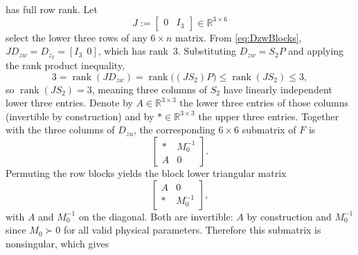 \documentclass[11pt]{article}
\newcommand{\R}{\mathbb{R}}
\newcommand{\rank}{\operatorname{rank}}
\begin{document}
has full row rank. Let
\begin{equation}
    J := \begin{bmatrix} 0 & I_3 \end{bmatrix} \in \R^{3\times 6}
    \label{eq:Jdef}
\end{equation}
select the lower three rows of any $6\times n$ matrix. From 
\eqref{eq:DzwBlocks}, $J D_{zw} = D_{z_2} = [I_3\ \ 0]$, which has rank~$3$. 
Substituting $D_{zw} = S_2 P$ and applying the rank product inequality,
\begin{equation}
    3 = \rank(J D_{zw}) = \rank\!\bigl((J S_2) P\bigr) \leq \rank(J S_2) \leq 3,
    \label{eq:rankJS2}
\end{equation}
so $\rank(J S_2) = 3$, meaning three columns of $S_2$ have linearly independent 
lower three entries. Denote by $A \in \R^{3\times 3}$ the lower three entries 
of those columns (invertible by construction) and by $* \in \R^{3\times 3}$ 
the upper three entries. Together with the three columns of $D_{zu}$, the 
corresponding $6\times 6$ submatrix of $F$ is
\begin{equation}
    \begin{bmatrix} * & M_0^{-1} \\ A & 0 \end{bmatrix}.
    \label{eq:submat}
\end{equation}
Permuting the row blocks yields the block lower triangular matrix
\begin{equation}
    \begin{bmatrix} A & 0 \\ * & M_0^{-1} \end{bmatrix},
    \label{eq:submatperm}
\end{equation}
with $A$ and $M_0^{-1}$ on the diagonal. Both are invertible: $A$ by 
construction and $M_0^{-1}$ since $M_0 \succ 0$ for all valid physical 
parameters. Therefore this submatrix is nonsingular, which gives
\end{document}
